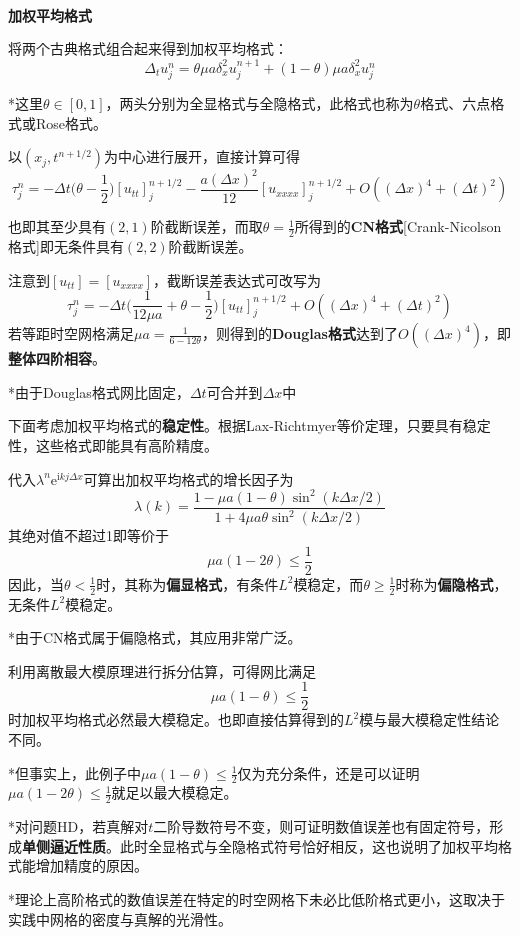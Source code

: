 \documentclass[a4paper,UTF8,fontset=windows]{ctexart}
\begin{document}
\

\textbf{加权平均格式}

将两个古典格式组合起来得到加权平均格式：
$$\Delta_tu_j^n=\theta\mu a\delta_x^2u_j^{n+1}+(1-\theta)\mu a\delta_x^2u_j^n$$

*这里$\theta\in[0,1]$，两头分别为全显格式与全隐格式，此格式也称为$\theta$格式、六点格式或Rose格式。

以$(x_j,t^{n+1/2})$为中心进行展开，直接计算可得
$$\tau_j^n=-\Delta t\bigg(\theta-\frac{1}{2}\bigg)[u_{tt}]_j^{n+1/2}-\frac{a(\Delta x)^2}{12}[u_{xxxx}]_j^{n+1/2}+O((\Delta x)^4+(\Delta t)^2)$$

也即其至少具有$(2,1)$阶截断误差，而取$\theta=\frac{1}{2}$所得到的\textbf{CN格式}[Crank-Nicolson格式]即无条件具有$(2,2)$阶截断误差。

注意到$[u_{tt}]=[u_{xxxx}]$，截断误差表达式可改写为
$$\tau_j^n=-\Delta t\bigg(\frac{1}{12\mu a}+\theta-\frac{1}{2}\bigg)[u_{tt}]_j^{n+1/2}+O((\Delta x)^4+(\Delta t)^2)$$
若等距时空网格满足$\mu a=\frac{1}{6-12\theta}$，则得到的\textbf{Douglas格式}达到了$O((\Delta x)^4)$，即\textbf{整体四阶相容}。

*由于Douglas格式网比固定，$\Delta t$可合并到$\Delta x$中

下面考虑加权平均格式的\textbf{稳定性}。根据Lax-Richtmyer等价定理，只要具有稳定性，这些格式即能具有高阶精度。

代入$\lambda^n\mathrm{e}^{\mathrm{i}kj\Delta x}$可算出加权平均格式的增长因子为
$$\lambda(k)=\frac{1-\mu a(1-\theta)\sin^2(k\Delta x/2)}{1+4\mu a\theta\sin^2(k\Delta x/2)}$$
其绝对值不超过1即等价于
$$\mu a(1-2\theta)\le\frac{1}{2}$$
因此，当$\theta<\frac{1}{2}$时，其称为\textbf{偏显格式}，有条件$L^2$模稳定，而$\theta\ge\frac{1}{2}$时称为\textbf{偏隐格式}，无条件$L^2$模稳定。

*由于CN格式属于偏隐格式，其应用非常广泛。

利用离散最大模原理进行拆分估算，可得网比满足
$$\mu a(1-\theta)\le\frac{1}{2}$$
时加权平均格式必然最大模稳定。也即直接估算得到的$L^2$模与最大模稳定性结论不同。

*但事实上，此例子中$\mu a(1-\theta)\le\frac{1}{2}$仅为充分条件，还是可以证明$\mu a(1-2\theta)\le\frac{1}{2}$就足以最大模稳定。

*对问题HD，若真解对$t$二阶导数符号不变，则可证明数值误差也有固定符号，形成\textbf{单侧逼近性质}。此时全显格式与全隐格式符号恰好相反，这也说明了加权平均格式能增加精度的原因。

*理论上高阶格式的数值误差在特定的时空网格下未必比低阶格式更小，这取决于实践中网格的密度与真解的光滑性。
\end{document}
